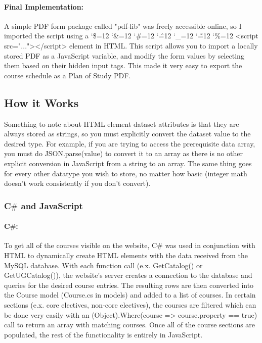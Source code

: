 \documentclass[12pt]{article}
\newenvironment{simplechar}{%
	\catcode`\$=12
	\catcode`\&=12
	\catcode`\#=12
	\catcode`\^=12
	\catcode`\_=12
	\catcode`\~=12
	\catcode`\%=12
}{}
\begin{document}
				\paragraph{Final Implementation:}
					A simple PDF form package called "pdf-lib" was freely accessible online, so I imported the script using a \begin{simplechar}<script src="..."></script>\end{simplechar} element in HTML. This script allows you to import a locally stored PDF as a JavaScript variable, and modify the form values by selecting them based on their hidden input tags. This made it very easy to export the course schedule as a Plan of Study PDF.
					
		\subsection{How it Works}
			Something to note about HTML element dataset attributes is that they are always stored as strings, so you must explicitly convert the dataset value to the desired type. For example, if you are trying to access the prerequisite data array, you must do JSON.parse(value) to convert it to an array as there is no other explicit conversion in JavaScript from a string to an array. The same thing goes for every other datatype you wish to store, no matter how basic (integer math doesn't work consistently if you don't convert).
			\subsubsection{\texorpdfstring{C$\#$ and JavaScript}{}} 
				\paragraph{C$\#$:}
					To get all of the courses visible on the website, C\# was used in conjunction with HTML to dynamically create HTML elements with the data received from the MySQL database. With each function call (e.x. GetCatalog() or GetUGCatalog()), the website's server creates a connection to the database and queries for the desired course entries. The resulting rows are then converted into the Course model (Course.cs in models) and added to a list of courses. In certain sections (e.x. core electives, non-core electives), the courses are filtered which can be done very easily with an (Object).Where(course => course.property == true) call to return an array with matching courses. Once all of the course sections are populated, the rest of the functionality is entirely in JavaScript. 
				 
\end{document}
